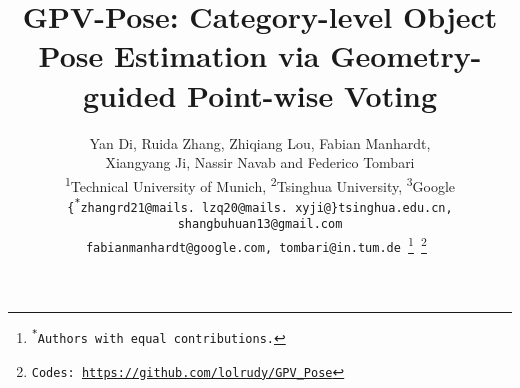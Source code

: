 \documentclass[10pt,twocolumn,letterpaper]{article}
\begin{document}
\title{GPV-Pose: Category-level Object Pose Estimation via Geometry-guided Point-wise Voting}

\author{Yan Di, Ruida Zhang, Zhiqiang Lou, Fabian Manhardt,\\
Xiangyang Ji, Nassir Navab and Federico Tombari\\
\textsuperscript{1}Technical University of Munich, \textsuperscript{2}Tsinghua University, \textsuperscript{3}Google\\
\tt\small{\{\textsuperscript{*}zhangrd21@mails. lzq20@mails. xyji@\}tsinghua.edu.cn},
\tt\small{shangbuhuan13@gmail.com}
\\
\tt\small{fabianmanhardt@google.com}, \tt\small{tombari@in.tum.de}
\thanks{\textsuperscript{*}Authors with equal contributions.}
\thanks{Codes: \url{https://github.com/lolrudy/GPV_Pose}}
}
\maketitle
\end{document}

